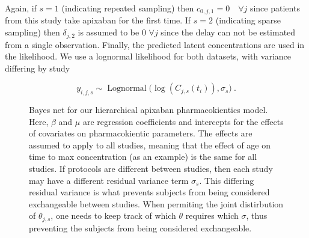 Again, if $s=1$ (indicating repeated sampling) then $c_{0, j, 1} = 0 \quad \forall j$ since patients from this study take apixaban for the first time.  If $s=2$ (indicating sparse sampling) then $\delta_{j, 2}$ is assumed to be 0 $\forall j$ since the delay can not be estimated from a single observation.  Finally, the predicted latent concentrations are used in the likelihood.  We use a lognormal likelihood for both datasets, with variance differing by study

$$ y_{i,j,s} \sim \operatorname{Lognormal}\Big( \log(C_{j, s}(t_i)), \sigma_s \Big)  \>.$$


\begin{figure}[t!]
	
	\centering
	\caption{Bayes net for our hierarchical apixaban pharmacokientics model.  Here, $\beta$ and $\mu$ are regression coefficients and intercepts for the effects of covariates on pharmacokientic parameters.  The effects are assumed to apply to all studies, meaning that the effect of age on time to max concentration (as an example) is the same for all studies.  If protocols are different between studies, then each study may have a different residual variance term $\sigma_s$.  This differing residual variance is what prevents subjects from being considered exchangeable between studies.  When permiting the joint distirbution of $\theta_{j, s}$, one needs to keep track of which $\theta$ requires which $\sigma$, thus preventing the subjects from being considered exchangeable.}
\end{figure}

